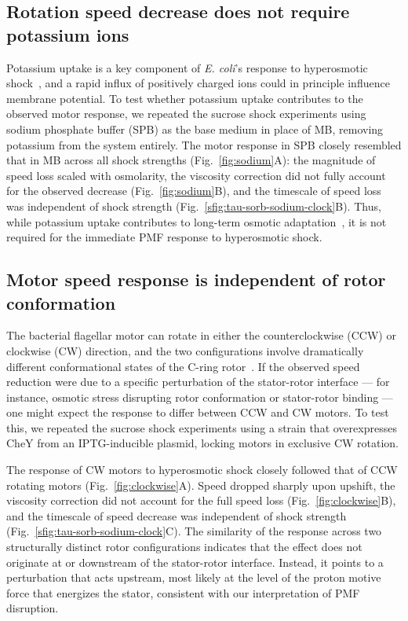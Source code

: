 \documentclass[twocolumn]{biophys-new}%
\begin{document}
\subsection*{Rotation speed decrease does not require potassium ions}

Potassium uptake is a key component of \textit{E. coli}'s response to hyperosmotic shock~\cite{STAUTZ20211,dinnbier1988transientl}, and a rapid influx of positively charged ions could in principle influence membrane potential. To test whether potassium uptake contributes to the observed motor response, we repeated the sucrose shock experiments using sodium phosphate buffer (SPB) as the base medium in place of MB, removing potassium from the system entirely. The motor response in SPB closely resembled that in MB across all shock strengths (Fig.~\ref{fig:sodium}A): the magnitude of speed loss scaled with osmolarity, the viscosity correction did not fully account for the observed decrease (Fig.~\ref{fig:sodium}B), and the timescale of speed loss was independent of shock strength (Fig.~\ref{sfig:tau-sorb-sodium-clock}B). Thus, while potassium uptake contributes to long-term osmotic adaptation~\cite{dinnbier1988transientl}, it is not required for the immediate PMF response to hyperosmotic shock.





\subsection*{Motor speed response is independent of rotor conformation}

The bacterial flagellar motor can rotate in either the counterclockwise (CCW) or clockwise (CW) direction, and the two configurations involve dramatically different conformational states of the C-ring rotor~\cite{chang2020,johnson2024,singh2024}. If the observed speed reduction were due to a specific perturbation of the stator-rotor interface --- for instance, osmotic stress disrupting rotor conformation or stator-rotor binding --- one might expect the response to differ between CCW and CW motors. To test this, we repeated the sucrose shock experiments using a strain that overexpresses CheY from an IPTG-inducible plasmid, locking motors in exclusive CW rotation.

The response of CW motors to hyperosmotic shock closely followed that of CCW rotating motors (Fig.~\ref{fig:clockwise}A). Speed dropped sharply upon upshift, the viscosity correction did not account for the full speed loss (Fig.~\ref{fig:clockwise}B), and the timescale of speed decrease was independent of shock strength (Fig.~\ref{sfig:tau-sorb-sodium-clock}C). The similarity of the response across two structurally distinct rotor configurations indicates that the effect does not originate at or downstream of the stator-rotor interface. Instead, it points to a perturbation that acts upstream, most likely at the level of the proton motive force that energizes the stator, consistent with our interpretation of PMF disruption.
\end{document}
